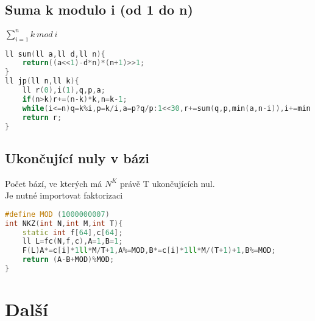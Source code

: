 \documentclass[11pt]{article}
\begin{document}
\subsection{Suma k modulo i (od 1 do n)}
$\sum\limits_{i=1}^n k\ mod\ i$
\begin{lstlisting}[language=C++]
ll sum(ll a,ll d,ll n){
    return((a<<1)-d*n)*(n+1)>>1;
}
ll jp(ll n,ll k){
    ll r(0),i(1),q,p,a;
    if(n>k)r+=(n-k)*k,n=k-1;
    while(i<=n)q=k%i,p=k/i,a=p?q/p:1<<30,r+=sum(q,p,min(a,n-i)),i+=min(a,n-i)+1;
    return r;
}
\end{lstlisting}
\subsection{Ukončující nuly v bázi}
Počet bází, ve kterých má $N^K$ právě \textsf{T} ukončujících nul.
\\Je nutné importovat faktorizaci
\begin{lstlisting}[language=C++]
#define MOD (1000000007)
int NKZ(int N,int M,int T){
    static int f[64],c[64];
    ll L=fc(N,f,c),A=1,B=1;
    F(L)A*=c[i]*1ll*M/T+1,A%=MOD,B*=c[i]*1ll*M/(T+1)+1,B%=MOD;
    return (A-B+MOD)%MOD;
}
\end{lstlisting}
\newpage\section{Další}
\end{document}
